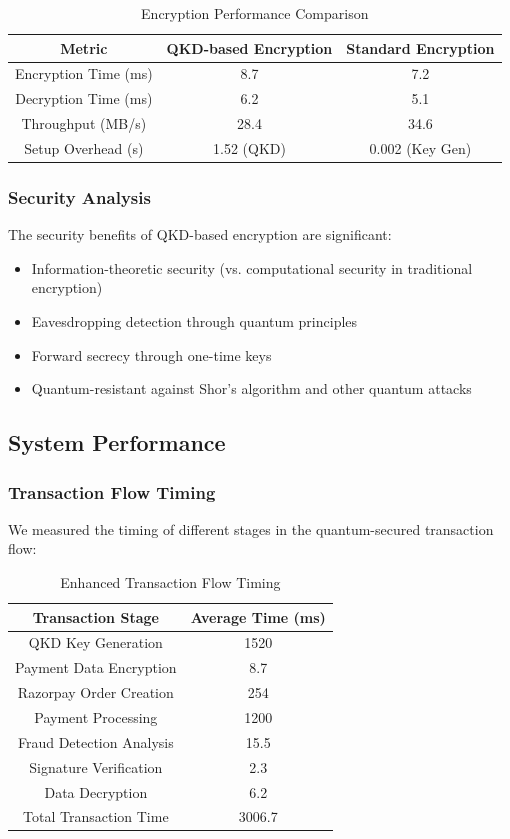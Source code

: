 \documentclass[conference]{IEEEtran}
\begin{document}
\begin{table}[h]
\centering
\begin{tabular}{|c|c|c|}
\hline
\textbf{Metric} & \textbf{QKD-based Encryption} & \textbf{Standard Encryption} \\
\hline
Encryption Time (ms) & 8.7 & 7.2 \\
\hline
Decryption Time (ms) & 6.2 & 5.1 \\
\hline
Throughput (MB/s) & 28.4 & 34.6 \\
\hline
Setup Overhead (s) & 1.52 (QKD) & 0.002 (Key Gen) \\
\hline
\end{tabular}
\caption{Encryption Performance Comparison}
\label{tab:encryption_performance}
\end{table}

\subsubsection{Security Analysis}
The security benefits of QKD-based encryption are significant:

\begin{itemize}
    \item Information-theoretic security (vs. computational security in traditional encryption)
    \item Eavesdropping detection through quantum principles
    \item Forward secrecy through one-time keys
    \item Quantum-resistant against Shor's algorithm and other quantum attacks
\end{itemize}

\subsection{System Performance}

\subsubsection{Transaction Flow Timing}
We measured the timing of different stages in the quantum-secured transaction flow:

\begin{table}[h]
\centering
\begin{tabular}{|c|c|}
\hline
\textbf{Transaction Stage} & \textbf{Average Time (ms)} \\
\hline
QKD Key Generation & 1520 \\
\hline
Payment Data Encryption & 8.7 \\
\hline
Razorpay Order Creation & 254 \\
\hline
Payment Processing & 1200 \\
\hline
Fraud Detection Analysis & 15.5 \\
\hline
Signature Verification & 2.3 \\
\hline
Data Decryption & 6.2 \\
\hline
Total Transaction Time & 3006.7 \\
\hline
\end{tabular}
\caption{Enhanced Transaction Flow Timing}
\label{tab:enhanced_transaction_timing}
\end{table}
\end{document}
